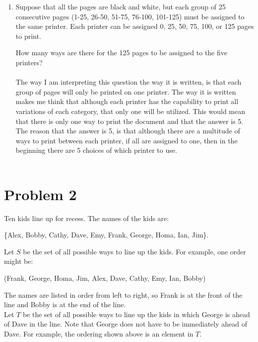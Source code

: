 \begin{enumerate}[label=(\alph*)]
        \\\\
 \item Suppose that all the pages are black and white, but each group of 25 consecutive pages (1-25, 26-50, 51-75, 76-100, 101-125) must be assigned to the same printer. Each printer can be assigned 0, 25, 50, 75, 100, or 125 pages to print.

How many ways are there for the 125 pages to be assigned to the five printers?\\\\
The way I am interpreting this question the way it is written, is that each group of pages will only be printed on one printer. The way it is written makes me think that although each printer has the capability to print all variations of each category, that only one will be utilized. This would mean that there is only one way to print the document and that the answer is 5. The reason that the answer is 5, is that although there are a multitude of ways to print between each printer, if all are assigned to one, then in the beginning there are 5 choices of which printer to use.
        \\\\
   \end{enumerate}
 \newpage

\section*{Problem 2}
Ten kids line up for recess. The names of the kids are:\\
\begin{center}
 \{Alex, Bobby, Cathy, Dave, Emy, Frank, George, Homa, Ian, Jim\}.\\
\end{center}
Let $S$ be the set of all possible ways to line up the kids. For example, one order might be:
\begin{center}
  (Frank, George, Homa, Jim, Alex, Dave, Cathy, Emy, Ian, Bobby)\\
\end{center}

The names are listed in order from left to right, so Frank is at the front of the line and Bobby is at the end of the line.\\

Let $T$ be the set of all possible ways to line up the kids in which George is ahead of Dave in the line. Note that George does not have to be immediately ahead of Dave. For example, the ordering shown above is an element in $T$.\\

